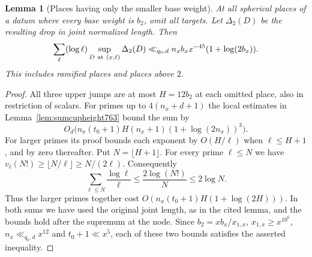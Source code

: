 \documentclass[a4paper,11pt]{article}
\newtheorem{lemma}[proposition]{Lemma}
\theoremstyle{definition}
\theoremstyle{remark}
\numberwithin{equation}{section}
\begin{document}
\begin{lemma}[Places having only the smaller base weight]
\leavevmode\label{lem:lightplaces771}
At all spherical places of a datum where every base weight
is \(b_2\), omit all targets. Let \(\Delta_2(D)\) be the
resulting drop in joint normalized length. Then
\[
 \sum_\ell(\log\ell)\sup_{D\ {\rm at}\ (x,\ell)}\Delta_2(D)
 \ll_{q_0,d} n_x b_x x^{-45}(1+\log(2b_x)).
\]
This includes ramified places and places above \(2\).
\end{lemma}
\begin{proof}
All three upper jumps are at most \(H=12b_2\) at each
omitted place, also in restriction of scalars.
For primes up to \(4(n_x+d+1)\) the local estimates in
Lemma~\ref{lem:sumcupheight763} bound the sum by
\[
 O_d\big(n_x(t_0+1)H(n_x+1)(1+\log(2n_x))^3\big).
\]
For larger primes its proof bounds each exponent by
\(O(H/\ell)\) when \(\ell\le H+1\), and by zero thereafter.
Put \(N=\lfloor H+1\rfloor\). For every prime \(\ell\le N\)
we have \(v_\ell(N!)\ge\lfloor N/\ell\rfloor\ge N/(2\ell)\).
Consequently
\[
       \sum_{\ell\le N}\frac{\log\ell}{\ell}
          \le \frac{2\log(N!)}{N}\le 2\log N.
\]
Thus the larger primes together cost
\(O(n_x(t_0+1)H(1+\log(2H)))\). In both sums we have
used the original joint length, as in the cited lemma,
and the bounds hold after the supremum at the node.
Since \(b_2=xb_x/x_{1,x}\), \(x_{1,x}\ge x^{10^6}\),
\(n_x\ll_{q_0,d}x^{12}\) and \(t_0+1\ll x^5\), each of
these two bounds satisfies the asserted inequality.
\end{proof}
\end{document}

